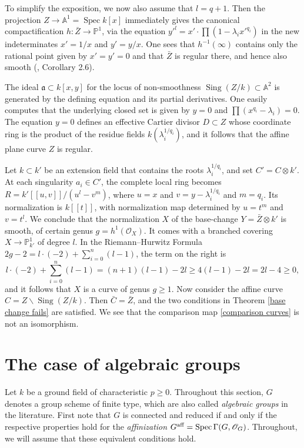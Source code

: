 \documentclass[oneside, 12pt]{amsart}
\newcommand\mylabel[1]{\label{#1}\marginpar{\vspace{-1ex}\medskip\medskip\footnotesize \tt #1}}
\renewcommand\mylabel[1]{\label{#1}}
\theoremstyle{definition}
\theoremstyle{remark}
\newcommand{\PP}{\mathbb{P}}
\renewcommand{\AA}{\mathbb{A}}
\newcommand{\ideala}{\mathfrak{a}}
\newcommand{\aff}{\text{\rm aff}}
\renewcommand{\O}{\mathscr{O}}
\newcommand{\ra}{\rightarrow}
\newcommand{\Sing}{\operatorname{Sing}}
\newcommand{\Spec}{\operatorname{Spec}}
\begin{document}
To simplify the exposition, we now also assume
that $l=q+1$. Then the projection $Z\ra \AA^1=\Spec k[x]$ immediately gives the canonical
compactification $h:\bar{Z}\ra\PP^1$, via the equation $y'^l=x'\cdot\prod(1-\lambda_ix'^{q_i})$ in the
new indeterminates    $x'=1/x$ and $y'=y/x$. One sees that $h^{-1}(\infty)$ contains only the  rational point given by $x'=y'=0$
and that $\bar{Z}$ is regular there, and hence also smooth (\cite{Fanelli; Schroeer 2020a}, Corollary 2.6).

The ideal   $\ideala\subset k[x,y]$ for the locus of non-smoothness $\Sing(Z/k)\subset \AA^2$ is generated by the defining equation and its partial derivatives.
One easily computes that the underlying closed set is given  by $y=0$ and $\prod(x^{q_i}-\lambda_i)=0$.
The equation $y=0$ defines an  effective Cartier divisor $D\subset Z$ whose coordinate ring  is the product of the
residue fields $k(\lambda_i^{1/q_i})$, and it follows that the affine plane curve $Z$ is regular.

Let $k\subset k'$ be an extension field that  contains the roots
$\lambda_i^{1/q_i}$,  and set $C'=C\otimes k'$.  At each singularity $a_i\in C'$, the complete local ring
becomes $R=k'[[u,v]]/(u^l-v^m)$, where $u=x$ and $v=y-\lambda_i^{1/q_i}$ and $m=q_i$.
Its normalization is $k[[t]]$, with normalization map   determined by  $u=t^m$ and $v=t^l$.
 We conclude that the normalization $X$ of the base-change $Y=\bar{Z}\otimes k'$
is smooth, of certain genus $g=h^1(\O_X)$. It comes with a branched covering $X\ra\PP^1_{k'}$ of degree $l$. In the Riemann--Hurwitz Formula  
$2g-2=l\cdot (-2) + \sum_{i=0}^n(l-1)$, the term on the right is
$$
l\cdot (-2) + \sum_{i=0}^n(l-1) = (n+1)(l-1)-2l \geq 4(l-1)-2l = 2l -4\geq 0,
$$
and it follows that $X$ is a curve of genus  $g\geq 1$.
Now consider the affine curve  $C=Z\smallsetminus \Sing(Z/k)$. Then $\bar{C}=\bar{Z}$,
and the two conditions in Theorem \ref{base change fails} are satisfied. We see that the comparison map \eqref{comparison curves} is not an isomorphism.


\section{The case of algebraic groups}
\mylabel{Algebraic groups}

Let $k$ be a ground field of characteristic $p\geq 0$.  Throughout this section, $G$
denotes a group scheme of finite type, which are also called \emph{algebraic groups} in the literature.
First note that $G$ is connected and reduced if and only if the respective properties hold for the
\emph{affinization} $G^\aff=\Spec\Gamma(G,\O_G)$. Throughout, we will assume that these equivalent conditions hold.
\end{document}
